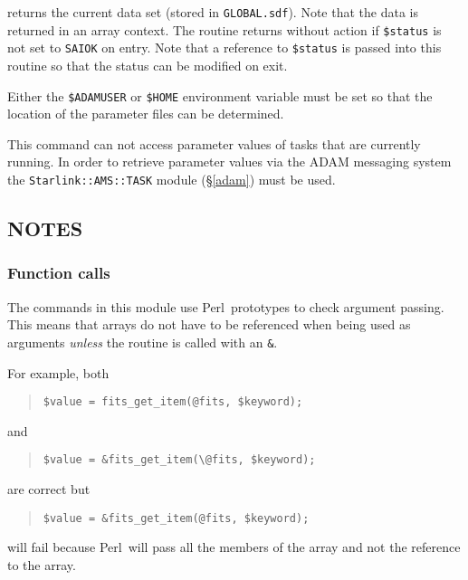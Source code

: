 \documentclass[twoside,11pt]{article}
\newenvironment{myquote}{\begin{quote}\begin{small}}{\end{small}\end{quote}}
\newcommand{\perl}{\xref{\textsf{Perl}}{sun193}{}}
\newcommand{\xref}[3]{#1}
\newcommand{\xlabel}[1]{}
\renewcommand{\_}{\texttt{\symbol{95}}}
\begin{document}
returns the current data set (stored in \texttt{GLOBAL.sdf}). Note that
the data is returned in an array context. The routine returns without
action if \texttt{\$status} is not set to \texttt{SAI\_\_OK} on entry.
Note that a reference to \texttt{\$status} is passed into this routine
so that the status can be modified on exit.

Either the \texttt{\$ADAM\_USER} or \texttt{\$HOME} environment
variable must be set so that the location of the parameter files can be
determined.

This command can not access parameter values of tasks that are currently
running.  In order to retrieve parameter values via the ADAM messaging system
the \texttt{Starlink::AMS::TASK} module (\S\ref{adam}) must be
used.

\subsection{\xlabel{notes}\label{notes}NOTES}

\subsubsection{Function calls}%

The commands in this module use  \perl\ prototypes to check argument 
passing. This means that arrays do not have to be referenced when being
used as arguments \emph{unless\/} the routine is called with an \texttt{\&}.

For example, both

\begin{myquote}
\begin{verbatim}
$value = fits_get_item(@fits, $keyword);
\end{verbatim}
\end{myquote}
and
\begin{myquote}
\begin{verbatim}
$value = &fits_get_item(\@fits, $keyword);
\end{verbatim}
\end{myquote}

are correct but
\begin{myquote} 
\begin{verbatim}
$value = &fits_get_item(@fits, $keyword);
\end{verbatim}
\end{myquote}

will fail because \perl\ will pass all the members of the array and not the
reference to the array. 
\end{document}
